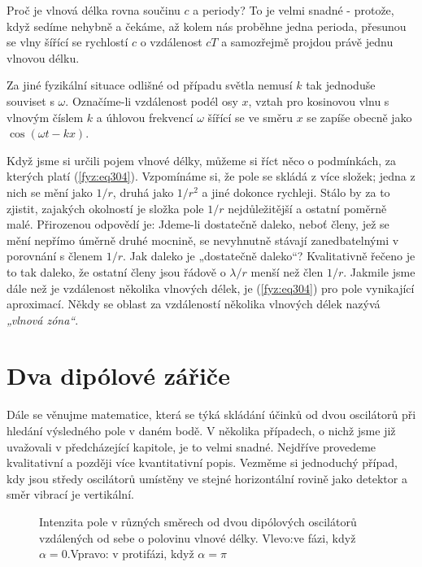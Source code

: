     Proč je vlnová délka rovna součinu \(c\) a periody? To je velmi snadné - protože, když sedíme 
    nehybně a čekáme, až kolem nás proběhne jedna perioda, přesunou se vlny šířící se rychlostí 
    \(c\) o vzdálenost \(cT\) a samozřejmě projdou právě jednu vlnovou délku.
    
    Za jiné fyzikální situace odlišné od případu světla nemusí \(k\) tak jednoduše souviset s 
    \(\omega\). Označíme-li vzdálenost podél osy \(x\), vztah pro kosinovou vlnu s vlnovým číslem 
    \(k\) a úhlovou frekvencí \(\omega\) šířící se ve směru \(x\) se zapíše obecně jako 
    \(\cos(\omega t-kx)\).
    
    Když jsme si určili pojem vlnové délky, můžeme si říct něco o podmínkách, za kterých platí 
    (\ref{fyz:eq304}). Vzpomínáme si, že pole se skládá z více složek; jedna z nich se mění jako 
    \(1/r\), druhá jako \(1/r^2\) a jiné dokonce rychleji. Stálo by za to zjistit, zajakých 
    okolností je složka pole \(1/r\) nejdůležitější a ostatní poměrně malé. Přirozenou odpovědí je: 
    Jdeme-li dostatečně daleko, neboť členy, jež se mění nepřímo úměrně druhé mocnině, se 
    nevyhnutně stávají zanedbatelnými v porovnání s členem \(1/r\). Jak daleko je „dostatečně 
    daleko“? Kvalitativně řečeno je to tak daleko, že ostatní členy jsou řádově o \(\lambda/r\) 
    menší než člen \(1/r\). Jakmile jsme dále než je vzdálenost několika vlnových délek, je 
    (\ref{fyz:eq304}) pro pole vynikající aproximací. Někdy se oblast za vzdáleností několika 
    vlnových délek nazývá \emph{„vlnová zóna“}.
    
  \section{Dva dipólové zářiče}\label{fyz:IchapXXIXsecIV}
    Dále se věnujme matematice, která se týká skládání účinků od dvou oscilátorů při hledání 
    výsledného pole v daném bodě. V několika případech, o nichž jsme již uvažovali v předcházející 
    kapitole, je to velmi snadné. Nejdříve provedeme kvalitativní a později více kvantitativní 
    popis. Vezměme si jednoduchý případ, kdy jsou středy oscilátorů umístěny ve stejné horizontální 
    rovině jako detektor a směr vibrací je vertikální.

    \begin{figure}[ht!]      %
      \centering
      \caption{Intenzita pole v různých směrech od dvou dipólových oscilátorů vzdálených od sebe  o 
               polovinu vlnové délky. Vlevo:ve fázi, když \(\alpha = 0\).Vpravo: v protifázi, když 
               \(\alpha = \pi\) \cite[s.~383]{Feynman01}}
      \label{fyz:fig236}
    \end{figure}

